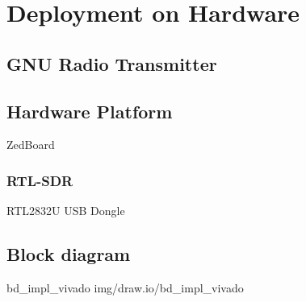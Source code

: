 \chapter{Deployment on Hardware}
\label{cha:DeploymentOnHardware}

\section{GNU Radio Transmitter}


\section{Hardware Platform}
ZedBoard


\subsection{RTL-SDR}
RTL2832U USB Dongle

\section{Block diagram}

 {bd_impl_vivado} {img/draw.io/bd_impl_vivado}
